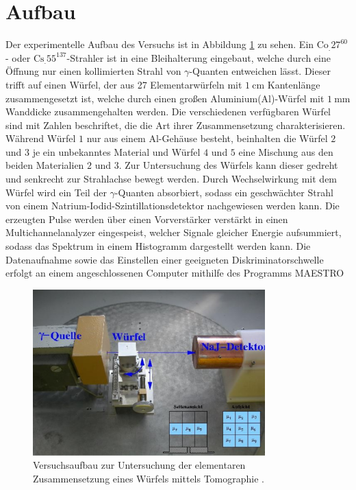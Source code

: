 \section{Aufbau}
\label{sec:Aufbau}

Der experimentelle Aufbau des Versuchs ist in Abbildung \ref{fig:aufbau} zu sehen.
Ein $\text{Co}_.{27}^\text{60}$- oder $\text{Cs}_.{55}^\text{137}$-Strahler ist in eine Bleihalterung eingebaut, welche durch eine Öffnung nur einen kollimierten Strahl von $\gamma$-Quanten entweichen lässt. Dieser trifft auf einen Würfel, der aus 27 Elementarwürfeln mit $\SI{1}{\centi\meter}$ Kantenlänge zusammengesetzt ist, welche durch einen großen Aluminium(Al)-Würfel mit $\SI{1}{\milli\meter}$ Wanddicke zusammengehalten werden.
Die verschiedenen verfügbaren Würfel sind mit Zahlen beschriftet, die die Art ihrer Zusammensetzung charakterisieren. Während Würfel $1$ nur aus einem Al-Gehäuse besteht, beinhalten die Würfel $2$ und $3$ je ein unbekanntes Material und Würfel $4$ und $5$ eine Mischung aus den beiden Materialien $2$ und $3$.
Zur Untersuchung des Würfels kann dieser gedreht und senkrecht zur Strahlachse bewegt werden.
Durch Wechselwirkung mit dem Würfel wird ein Teil der $\gamma$-Quanten absorbiert, sodass ein geschwächter Strahl von einem Natrium-Iodid-Szintillationsdetektor nachgewiesen werden kann. Die erzeugten Pulse werden über einen Vorverstärker verstärkt in einen Multichannelanalyzer eingespeist, welcher Signale gleicher Energie aufsummiert, sodass das Spektrum in einem Histogramm dargestellt werden kann.
Die Datenaufnahme sowie das Einstellen einer geeigneten Diskriminatorschwelle erfolgt an einem angeschlossenen Computer mithilfe des Programms MAESTRO
\begin{figure}
\centering
\includegraphics[keepaspectratio,width=0.8\textwidth]{content/images/aufbau.png}
\caption{Versuchsaufbau zur Untersuchung der elementaren Zusammensetzung eines Würfels mittels Tomographie \cite{V14}.}
\label{fig:aufbau}
\end{figure}